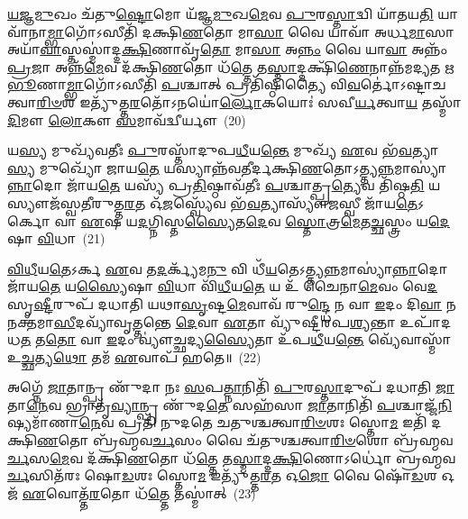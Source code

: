 \-\ul{𑌯}\-\-\ul{𑌜𑍍𑌞}\-\-\ul{𑌮𑍁}\-𑌖𑌂 𑌚᳴𑌤𑍁\-\ul{𑌷𑍍𑌟𑍋}\-𑌮𑍋 𑌯᳴𑌜𑍍𑌞\-\ul{𑌮𑍁}\-𑌖\-\ul{𑌮𑍇}\-𑌵 \ul{𑌪𑍁}\-𑌰\-\ul{𑌸𑍍𑌤𑌾}\-𑌦𑍍𑌵𑌿 𑌯𑌾᳴𑌤𑌯\-\ul{𑌤𑌿} 𑌯𑌾𑌵𑌾᳴𑌨𑌾\-\ul{𑌮𑍍𑌭𑌾}\-𑌗𑍋᳴\-𑌽𑌸𑍀𑌤𑌿᳴ 𑌦𑌕𑍍𑌷𑌿\-\ul{𑌣}\-𑌤𑍋 𑌮𑌾\-\ul{𑌸𑌾} 𑌵𑍈 𑌯𑌾𑌵𑌾᳴ 𑌅𑌰𑍍𑌧\-\ul{𑌮𑌾}\-𑌸𑌾 𑌅𑌯𑌾᳴\-\ul{𑌵𑌾}\-𑌸𑍍𑌤𑌸𑍍𑌮𑌾॑𑌦𑍍𑌦\-\ul{𑌕𑍍𑌷𑌿}\-𑌣𑌾𑌵𑍃᳴\-\ul{𑌤𑍋} 𑌮𑌾\-\ul{𑌸𑌾} 𑌅\-\ul{𑌨𑍍𑌨𑌂} 𑌵𑍈 𑌯𑌾\-\ul{𑌵𑌾} 𑌅𑌨𑍍𑌨𑌂᳴ \ul{𑌪𑍍𑌰}\-𑌜𑌾 𑌅𑌨𑍍𑌨᳴\-\ul{𑌮𑍇}\-𑌵 𑌦᳴𑌕𑍍𑌷𑌿\-\ul{𑌣}\-𑌤𑍋 𑌧᳴\-\ul{𑌤𑍍𑌤𑍇} 𑌤\-\ul{𑌸𑍍𑌮𑌾}\-𑌦𑍍𑌦𑌕𑍍𑌷𑌿᳴\-\ul{𑌣𑍇}\-𑌨𑌾𑌨𑍍𑌨᳴𑌮𑌦𑍍𑌯𑌤 𑌋\-\ul{𑌭𑍂}\-𑌣𑌾\-\ul{𑌮𑍍𑌭𑌾}\-𑌗𑍋᳴\-𑌽𑌸𑍀𑌤𑌿᳴ \ul{𑌪}\-𑌶𑍍𑌚𑌾𑌤𑍍 𑌪𑍍𑌰𑌤𑌿᳴𑌷𑍍𑌠𑌿𑌤𑍍𑌯𑍈 𑌵𑌿\-\ul{𑌵}\-𑌰𑍍𑌤𑍋॑\-𑌽𑌷𑍍𑌟𑌾𑌚𑌤𑍍𑌵𑌾\-\ul{𑌰𑌿}\-\-\ul{𑍞}\-𑌶 𑌇𑌤𑍍𑌯𑍁᳴𑌤𑍍𑌤\-\ul{𑌰}\-𑌤𑍋᳴\-𑌽𑌨𑌯𑍋॑\-\ul{𑌰𑍍𑌲𑍋}\-𑌕𑌯𑍋𑌃॑ 𑌸𑌵𑍀\-\ul{𑌰𑍍𑌯}\-𑌤𑍍𑌵𑌾\-\ul{𑌯} 𑌤𑌸𑍍𑌮𑌾᳴\-\ul{𑌦𑌿}\-𑌮𑍗 \ul{𑌲𑍋}\-𑌕𑍗 \ul{𑌸}\-𑌮𑌾𑌵᳴𑌦𑍍𑌵𑍀𑌰𑍍𑌯𑍗~(20)

𑌯\-\ul{𑌸𑍍𑌯} 𑌮𑍁𑌖𑍍𑌯᳴𑌵𑌤𑍀𑌃 \ul{𑌪𑍁}\-𑌰𑌸𑍍𑌤𑌾᳴𑌦𑍁𑌪\-\ul{𑌧𑍀}\-𑌯\-\ul{𑌨𑍍𑌤𑍇} 𑌮𑍁𑌖𑍍𑌯᳴ \ul{𑌏}\-𑌵 𑌭᳴\-\ul{𑌵}\-𑌤𑍍𑌯𑌾\-\ul{𑌸𑍍𑌯} 𑌮𑍁𑌖𑍍𑌯𑍋᳴ 𑌜𑌾𑌯\-\ul{𑌤𑍇} 𑌯𑌸𑍍𑌯𑌾𑌨𑍍𑌨᳴𑌵𑌤𑍀𑌰𑍍𑌦𑌕𑍍𑌷𑌿\-\ul{𑌣}\-𑌤𑍋\-𑌽𑌤𑍍𑌤𑍍𑌯\-\ul{𑌨𑍍𑌨}\-𑌮𑌾𑌸𑍍𑌯𑌾॑\-\ul{𑌨𑍍𑌨𑌾}\-𑌦𑍋 𑌜𑌾᳴𑌯\-\ul{𑌤𑍇} 𑌯𑌸𑍍𑌯᳴ 𑌪𑍍𑌰\-\ul{𑌤𑌿}\-𑌷𑍍𑌠𑌾𑌵᳴𑌤𑍀𑌃 \ul{𑌪}\-𑌶𑍍𑌚𑌾𑌤𑍍𑌪𑍍𑌰\-\ul{𑌤𑍍𑌯𑍇}\-𑌵 𑌤𑌿᳴𑌷𑍍𑌠\-\ul{𑌤𑌿} 𑌯𑌸𑍍𑌯𑍗𑌜᳴𑌸𑍍𑌵𑌤𑍀𑌰𑍁𑌤𑍍𑌤\-\ul{𑌰}\-𑌤 𑌓᳴\-\ul{𑌜}\-𑌸𑍍𑌵𑍍𑌯𑍇᳴𑌵 𑌭᳴\-\ul{𑌵}\-𑌤𑍍𑌯𑌾𑌸𑍍𑌯𑍗᳴\-\ul{𑌜}\-𑌸𑍍𑌵𑍀 𑌜𑌾᳴𑌯\-\ul{𑌤𑍇}\-\-𑌽𑌰𑍍𑌕𑍋 𑌵𑌾 \ul{𑌏}\-𑌷 𑌯\-\ul{𑌦}\-𑌗𑍍𑌨𑌿𑌸𑍍𑌤\-\ul{𑌸𑍍𑌯𑍈}\-𑌤\-\ul{𑌦𑍇}\-𑌵 \ul{𑌸𑍍𑌤𑍋}\-𑌤𑍍𑌰\-\ul{𑌮𑍇}\-𑌤\-\ul{𑌚𑍍𑌛}\-𑌸𑍍𑌤𑍍𑌰𑌂 𑌯\-\ul{𑌦𑍇}\-𑌷𑌾 \ul{𑌵𑌿}\-𑌧𑌾~(21)

\-\ul{𑌵𑌿}\-\-\ul{𑌧𑍀}\-𑌯\-\ul{𑌤𑍇}\-\-𑌽𑌰𑍍𑌕 \ul{𑌏}\-𑌵 𑌤\-\ul{𑌦}\-𑌰𑍍𑌕𑍍𑌯᳴𑌮\-\ul{𑌨𑍁} 𑌵𑌿 𑌧𑍀᳴\-\ul{𑌯}\-𑌤𑍇\-𑌽𑌤𑍍𑌤𑍍𑌯\-\ul{𑌨𑍍𑌨}\-𑌮𑌾𑌸𑍍𑌯𑌾॑\-\ul{𑌨𑍍𑌨𑌾}\-𑌦𑍋 𑌜𑌾᳴𑌯\-\ul{𑌤𑍇} 𑌯\-\ul{𑌸𑍍𑌯𑍈}\-𑌷𑌾 \ul{𑌵𑌿}\-𑌧𑌾 𑌵𑌿᳴\-\ul{𑌧𑍀}\-𑌯\-\ul{𑌤𑍇} 𑌯 𑌉᳴ 𑌚𑍈𑌨𑌾\-\ul{𑌮𑍇}\-𑌵𑌂 𑌵𑍇\-\ul{𑌦} 𑌸𑍃\-\ul{𑌷𑍍𑌟𑍀}\-𑌰𑍁𑌪᳴ 𑌦𑌧𑌾𑌤𑌿 𑌯𑌥𑌾\-\ul{𑌸𑍃}\-𑌷𑍍𑌟\-\ul{𑌮𑍇}\-𑌵𑌾𑌵᳴ 𑌰𑍁\-\ul{𑌨𑍍𑌦𑍍𑌧𑍇} 𑌨 𑌵𑌾 \ul{𑌇}\-𑌦𑌂 𑌦𑌿\-\ul{𑌵𑌾} 𑌨 𑌨𑌕𑍍𑌤᳴𑌮𑌾\-\ul{𑌸𑍀}\-𑌦𑌵𑍍𑌯𑌾᳴𑌵𑍃\-\ul{𑌤𑍍𑌤}\-𑌨𑍍𑌤𑍇 \ul{𑌦𑍇}\-𑌵𑌾 \ul{𑌏}\-𑌤𑌾 𑌵𑍍𑌯𑍁᳴𑌷𑍍𑌟𑍀𑌰𑌪\-\ul{𑌶𑍍𑌯}\-𑌨𑍍𑌤𑌾 𑌉𑌪𑌾᳴𑌦𑌧\-\ul{𑌤} 𑌤\-\ul{𑌤𑍋} 𑌵𑌾 \ul{𑌇}\-𑌦𑌂 𑌵𑍍𑌯𑍗॑\-\ul{𑌚𑍍𑌛}\-𑌦𑍍𑌯\-\ul{𑌸𑍍𑌯𑍈}\-𑌤𑌾 𑌉᳴𑌪\-\ul{𑌧𑍀}\-𑌯\-\ul{𑌨𑍍𑌤𑍇} 𑌵𑍍𑌯𑍇᳴𑌵𑌾𑌸𑍍𑌮𑌾᳴ 𑌉\-\ul{𑌚𑍍𑌛}\-𑌤𑍍𑌯\-\ul{𑌥𑍋} 𑌤𑌮᳴ \ul{𑌏}\-𑌵𑌾𑌪᳴ 𑌹𑌤𑍇॥~(22)

{\anuvakamend[{𑌵𑍈 \ul{𑌜}\-𑌨𑌿𑌤𑍍𑌰𑌂᳴ 𑌪𑌞𑍍𑌚\-\ul{𑌦}\-𑌶𑍋\-𑌽𑌦𑌿᳴𑌤𑍍𑌯𑍈 \ul{𑌭𑌾}\-𑌗𑍋 𑌵𑍈 \ul{𑌧}\-𑌰𑍍𑌤𑍍𑌰𑌃 \ul{𑌸}\-𑌮𑌾𑌵᳴𑌦𑍍𑌵𑍀𑌰𑍍𑌯𑍗 \ul{𑌵𑌿}\-𑌧𑌾 𑌤\-\ul{𑌤𑍋} 𑌵𑌾 \ul{𑌇}\-𑌦𑌂 𑌚𑌤𑍁᳴𑌰𑍍𑌦𑌶 𑌚}]}%

𑌅𑌗𑍍𑌨𑍇᳴ \ul{𑌜𑌾}\-𑌤𑌾𑌨𑍍𑌪𑍍𑌰 𑌣𑍁᳴𑌦𑌾 𑌨𑌃 \ul{𑌸}\-𑌪\-\ul{𑌤𑍍𑌨𑌾}\-𑌨𑌿𑌤𑌿᳴ \ul{𑌪𑍁}\-𑌰\-\ul{𑌸𑍍𑌤𑌾}\-𑌦𑍁𑌪᳴ 𑌦𑌧𑌾𑌤𑌿 \ul{𑌜𑌾}\-𑌤𑌾\-\ul{𑌨𑍇}\-𑌵 𑌭𑍍𑌰𑌾𑌤𑍃᳴\-\ul{𑌵𑍍𑌯𑌾}\-𑌨𑍍𑌪𑍍𑌰 𑌣𑍁᳴𑌦\-\ul{𑌤𑍇} 𑌸𑌹᳴𑌸𑌾 \ul{𑌜𑌾}\-𑌤𑌾𑌨𑌿𑌤𑌿᳴ \ul{𑌪}\-𑌶𑍍𑌚𑌾𑌜𑍍𑌜᳴\-\ul{𑌨𑌿}\-𑌷𑍍𑌯𑌮𑌾᳴𑌣𑌾\-\ul{𑌨𑍇}\-𑌵 𑌪𑍍𑌰𑌤𑌿᳴ 𑌨𑍁𑌦𑌤𑍇 𑌚𑌤𑍁𑌶𑍍𑌚𑌤𑍍𑌵𑌾\-\ul{𑌰𑌿}\-\-\ul{𑍞}\-𑌶𑌃 𑌸𑍍𑌤𑍋\-\ul{𑌮} 𑌇𑌤𑌿᳴ 𑌦𑌕𑍍𑌷𑌿\-\ul{𑌣}\-𑌤𑍋 𑌬𑍍𑌰᳴𑌹𑍍𑌮𑌵\-\ul{𑌰𑍍𑌚}\-𑌸𑌂 𑌵𑍈 𑌚᳴𑌤𑍁𑌶𑍍𑌚𑌤𑍍𑌵𑌾\-\ul{𑌰𑌿}\-\-\ul{𑍞}\-𑌶𑍋 𑌬𑍍𑌰᳴𑌹𑍍𑌮𑌵\-\ul{𑌰𑍍𑌚}\-𑌸\-\ul{𑌮𑍇}\-𑌵 𑌦᳴𑌕𑍍𑌷𑌿\-\ul{𑌣}\-𑌤𑍋 𑌧᳴\-\ul{𑌤𑍍𑌤𑍇} 𑌤\-\ul{𑌸𑍍𑌮𑌾}\-𑌦𑍍𑌦\-\ul{𑌕𑍍𑌷𑌿}\-𑌣𑍋\-𑌽𑌰𑍍𑌧𑍋॑ 𑌬𑍍𑌰𑌹𑍍𑌮𑌵\-\ul{𑌰𑍍𑌚}\-𑌸𑌿𑌤᳴𑌰𑌃 𑌷𑍋\-\ul{𑌡}\-𑌶𑌃 𑌸𑍍𑌤𑍋\-\ul{𑌮} 𑌇𑌤𑍍𑌯𑍁᳴𑌤𑍍𑌤\-\ul{𑌰}\-𑌤 𑌓\-\ul{𑌜𑍋} 𑌵𑍈 𑌷𑍋᳴\-\ul{𑌡}\-𑌶 𑌓𑌜᳴ \ul{𑌏}\-𑌵𑍋𑌤𑍍𑌤᳴\-\ul{𑌰}\-𑌤𑍋 𑌧᳴\-\ul{𑌤𑍍𑌤𑍇} 𑌤𑌸𑍍𑌮𑌾॑𑌤𑍍~(23)

